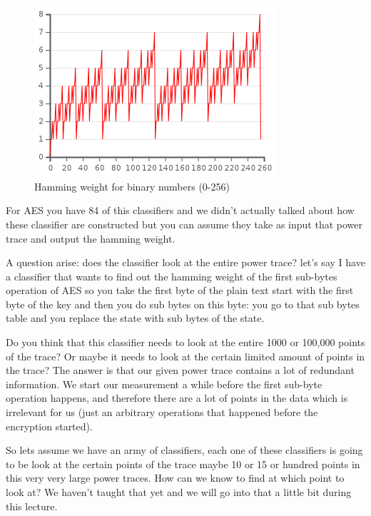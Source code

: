 \begin{figure}[!ht]
    \centering
    \includegraphics[width=0.8\textwidth]{images/Lecture6/HammingWeightBinary.png}
    \caption{Hamming weight for binary numbers (0-256)} \label{fig:HammingWeightBinary }
\end{figure}

For AES you have 84 of this classifiers and we didn't actually talked about how
these classifier are constructed but you can assume they take as input that
power trace and output the hamming weight. 

A question arise: does the classifier look at the entire power trace? let's say
I have a classifier that wants to find out the hamming weight of the first
sub-bytes operation of AES so you take the first byte of the plain text start
with the first byte of the key and then you do sub bytes on this byte: you go to
that sub bytes table and you replace the state with sub bytes of the state. 

Do you think that this classifier needs to look at the entire 1000 or 100,000
points of the trace? Or maybe it needs to look at the certain limited amount of
points in the trace? The answer is that our given power trace contains a lot of
redundant information. We start our measurement a while before the first
sub-byte operation happens, and therefore there are a lot of points in the data
which is irrelevant for us (just an arbitrary operations that happened before
the encryption started).

So lets assume we have an army of classifiers, each one of these classifiers is
going to be look at the certain points of the trace maybe 10 or 15 or hundred
points in this very very large power traces. How can we know to find at which
point to look at? We haven't taught that yet and we will go into that a little
bit during this lecture. 
 
